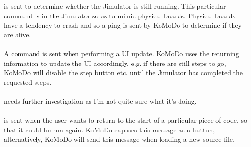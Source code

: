 %
%
%
 is sent to determine whether the Jimulator is still running. This particular command is in the Jimulator so as to mimic physical boards. Physical boards have a tendency to crash and so a ping is sent by KoMoDo to determine if they are alive.\\\\
%
A  command is sent when performing a UI update. KoMoDo uses the returning information to update the UI accordingly, e.g. if there are still steps to go, KoMoDo will disable the step button etc. until the Jimulator has completed the requested steps.\\\\
%
 needs further investigation as I'm not quite sure what it's doing.\\\\ 
%
%
%
%
 is sent when the user wants to return to the start of a particular piece of code, so that it could be run again. KoMoDo exposes this message as a button, alternatively, KoMoDo will send this message when loading a new source file.\\\\
